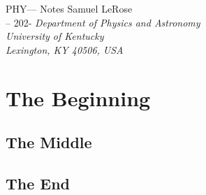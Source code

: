 \documentclass[12pt]{report}
\newcommand{\name}{Samuel LeRose}              %
\newcommand{\semester}{-- 202-}        %
\newcommand{\hwTitle}{PHY--- Notes}  %
\begin{document}
\begin{titlepage}
\begin{center}
    \vspace*{1.5in}
    {\Large{\hwTitle}}
    \vskip 0.25in \name\\
    \semester
    \vskip 0.25in {\it Department of Physics and Astronomy\\ University of Kentucky\\ Lexington, KY 40506, USA}
\end{center}
\vskip 0.5in
\end{titlepage}

\tableofcontents

\chapter{The Beginning}

\section{The Middle}



\section[3]{The End}    %

\end{document}
